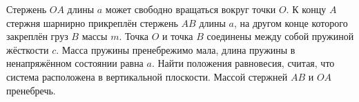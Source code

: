 Стержень $OA$ длины $a$ может свободно вращаться вокруг точки $O$.
К концу $A$ стержня шарнирно прикреплён стержень $AB$ длины $a$,
на другом конце которого закреплён груз $B$ массы $m$.
Точка $O$ и точка $B$ соединены между собой пружиной жёсткости $c$.
Масса пружины пренебрежимо мала,
длина пружины в ненапряжённом состоянии равна $a$.
Найти положения равновесия, считая,
что система расположена в вертикальной плоскости.
Массой стержней $AB$ и $OA$ пренебречь.
